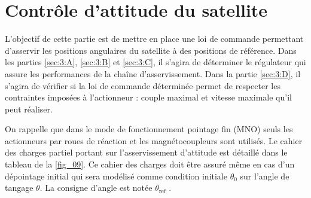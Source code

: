 
\section{Contrôle d’attitude du satellite \label{sec:3}} \label{partieIII}
\begin{obj}
L’objectif de cette partie est de mettre en place une loi de commande permettant d’asservir les
positions angulaires du satellite à des positions de référence. Dans les parties \autoref{sec:3:A}, \autoref{sec:3:B} et \autoref{sec:3:C},
il s’agira de déterminer le régulateur qui assure les performances de la chaîne d’asservissement.
Dans la partie \autoref{sec:3:D}, il s’agira de vérifier si la loi de commande déterminée permet de respecter
les contraintes imposées à l’actionneur : couple maximal et vitesse maximale qu’il peut réaliser.
\end{obj}

\ifprof
\else

On rappelle que dans le mode de fonctionnement pointage fin (MNO) seuls les actionneurs par roues de réaction
et les magnétocoupleurs sont utilisés. Le cahier des charges partiel portant sur l’asservissement d’attitude est
détaillé dans le tableau de la \autoref{fig_09}. Ce cahier des charges doit être assuré même en cas d’un dépointage
initial qui sera modélisé comme condition initiale $\theta_0$ sur l’angle de tangage $\theta$. La consigne d’angle est notée $\theta_{\text{ref}}$ .

